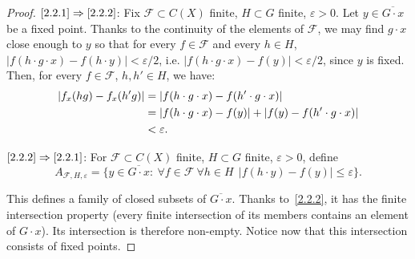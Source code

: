 \documentclass[10pt,a4paper]{article}
\theoremstyle{definition}
\numberwithin{equation}{section}
\numberwithin{figure}{section}
\numberwithin{table}{section}
\newcommand{\e}{\varepsilon}
\let\oldforall\forall
\renewcommand*{\forall}{\mathrel{\oldforall}}
\begin{document}
\begin{proof}
$\eqref{2.2.1}\Rightarrow \eqref{2.2.2}$: Fix $\mathcal F\subset C(X)$ finite, $H\subset G$ finite, $\varepsilon>0$. Let $y\in \overline{G\cdot x}$ be a fixed point. Thanks to the continuity of the elements of $\mathcal F$, we may find $g\cdot x$ close enough to $y$ so that for every $f\in \mathcal F$ and every $h\in H$, $|f(h\cdot g\cdot x) - f(h\cdot y)|<\e/2$, i.e. $|f(h\cdot g\cdot x) - f(y)|<\e/2$, since $y$ is fixed. Then, for every $f\in \mathcal F$, $h, h'\in H$, we have:
\begin{align*}
\ensuremath
\left|f_{x}(hg) - f_{x}(h'g)\right| & = |f(h\cdot g\cdot x) - f(h'\cdot g\cdot x)| \\
& = |f(h\cdot g\cdot x) - f(y)| + |f(y) - f(h'\cdot g\cdot x)| \\
& < \e.
\end{align*}

$\eqref{2.2.2}\Rightarrow \eqref{2.2.1}$: For $\mathcal F\subset C(X)$ finite, $H\subset G$ finite, $\varepsilon>0$, define
\[
A_{\mathcal F, H, \varepsilon} = \{ y\in \overline{G\cdot x} :\: \forall f \in \mathcal F \ \forall h\in H \ \ |f(h\cdot y) - f(y)|\leq \varepsilon\}.
\]

This defines a family of closed subsets of $\overline{G\cdot x}$. Thanks to~\eqref{2.2.2}, it has the finite intersection property (every finite intersection of its members contains an element of $G\cdot x$). Its intersection is therefore non-empty. Notice now that this intersection consists of fixed points.
\end{proof}
\end{document}
